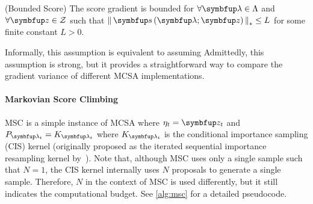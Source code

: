 
\begin{assumption}{(Bounded Score)}\label{thm:bounded_score}
  The score gradient is bounded for \(\forall \vlambda \in \Lambda\) and \(\forall \vz \in \mathcal{Z}\) such that \(\norm{\vs\left(\vlambda; \vz\right)}_* \leq L \) for some finite constant \(L > 0\).
\end{assumption}
Informally, this assumption is equivalent to assuming 
Admittedly, this assumption is strong, but it provides a straightforward way to compare the gradient variance of different MCSA implementations.

%



\vspace{-0.05in}
\paragraph{Markovian Score Climbing}
MSC is a simple instance of MCSA where \(\eta_t = \vz_t\) and \(P_{\vlambda_t} = K_{\vlambda_t}\) where \(K_{\vlambda_t}\) is the conditional importance sampling (CIS) kernel (originally proposed as the iterated sequential importance resampling kernel by~\citet{andrieu_uniform_2018}).
Note that, although MSC uses only a single sample such that \(N=1\), the CIS kernel internally uses \(N\) proposals to generate a single sample.
Therefore, \(N\) in the context of MSC is used differently, but it still indicates the computational budget.
See \cref{alg:msc} for a detailed pseudocode.

